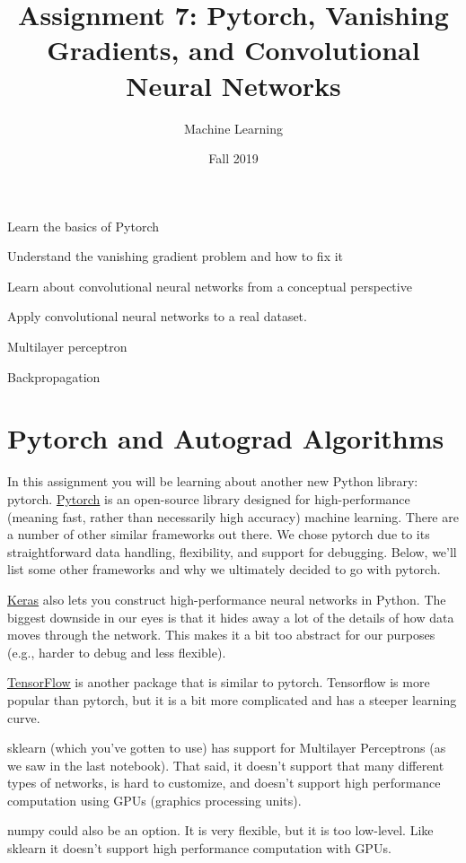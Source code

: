 \documentclass[assignment07_Solutions]{subfiles}
\title{Assignment 7: Pytorch, Vanishing Gradients, and Convolutional Neural Networks}
\author{Machine Learning}
\date{Fall 2019}
\begin{document}
\maketitle
\thispagestyle{firstpage}


\begin{learningobjectives}
\bi
\item Learn the basics of Pytorch
\item Understand the vanishing gradient problem and how to fix it
\item Learn about convolutional neural networks from a conceptual perspective
\item Apply convolutional neural networks to a real dataset.
\ei
\end{learningobjectives}

\begin{priorknowledge}
\bi
\item Multilayer perceptron
\item Backpropagation
\ei
\end{priorknowledge}

\section{Pytorch and Autograd Algorithms}

In this assignment you will be learning about another new Python library: pytorch.  \href{https://pytorch.org/}{Pytorch} is an open-source library designed for high-performance (meaning fast, rather than necessarily high accuracy) machine learning.  There are a number of other similar frameworks out there.  We chose pytorch due to its straightforward data handling, flexibility, and support for debugging.  Below, we'll list some other frameworks and why we ultimately decided to go with pytorch.

\bi
\item \href{https://keras.io/}{Keras} also lets you construct high-performance neural networks in Python.  The biggest downside in our eyes is that it hides away a lot of the details of how data moves through the network.  This makes it a bit too abstract for our purposes (e.g., harder to debug and less flexible).
\item \href{https://www.tensorflow.org/}{TensorFlow} is another package that is similar to pytorch.  Tensorflow is more popular than pytorch, but it is a bit more complicated and has a steeper learning curve.
\item sklearn (which you've gotten to use) has support for Multilayer Perceptrons (as we saw in the last notebook).  That said, it doesn't support that many different types of networks, is hard to customize, and doesn't support high performance computation using GPUs (graphics processing units).
\item numpy could also be an option.  It is very flexible, but it is too low-level.  Like sklearn it doesn't support high performance computation with GPUs.
\ei
\end{document}
